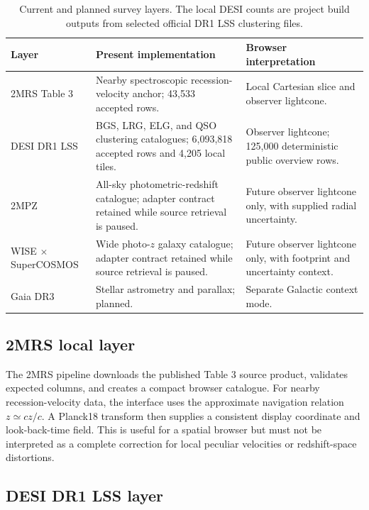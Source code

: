 \documentclass[11pt,a4paper]{article}
\begin{document}
\begin{table}[h]
\centering
\footnotesize
\renewcommand{\arraystretch}{1.22}
\begin{tabularx}{\textwidth}{@{}p{}X X@{}}
\toprule
Layer & Present implementation & Browser interpretation \\
\midrule
2MRS Table 3 & Nearby spectroscopic recession-velocity anchor; 43,533 accepted rows. & Local Cartesian slice and observer lightcone. \\
DESI DR1 LSS & BGS, LRG, ELG, and QSO clustering catalogues; 6,093,818 accepted rows and 4,205 local tiles. & Observer lightcone; 125,000 deterministic public overview rows. \\
2MPZ & All-sky photometric-redshift catalogue; adapter contract retained while source retrieval is paused. & Future observer lightcone only, with supplied radial uncertainty. \\
WISE $\times$ SuperCOSMOS & Wide photo-$z$ galaxy catalogue; adapter contract retained while source retrieval is paused. & Future observer lightcone only, with footprint and uncertainty context. \\
Gaia DR3 & Stellar astrometry and parallax; planned. & Separate Galactic context mode. \\
\bottomrule
\end{tabularx}
\caption{Current and planned survey layers. The local DESI counts are project build outputs from selected official DR1 LSS clustering files.}
\end{table}

\subsection{2MRS local layer}

The 2MRS pipeline downloads the published Table 3 source product, validates expected columns, and creates a compact browser catalogue. For nearby recession-velocity data, the interface uses the approximate navigation relation $z \simeq cz/c$. A Planck18 transform then supplies a consistent display coordinate and look-back-time field. This is useful for a spatial browser but must not be interpreted as a complete correction for local peculiar velocities or redshift-space distortions.

\subsection{DESI DR1 LSS layer}
\end{document}
